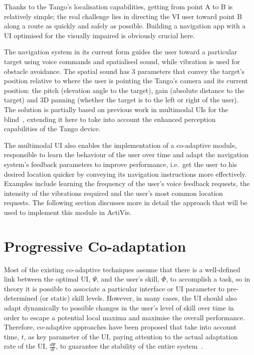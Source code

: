 \documentclass[letterpaper]{article}
\begin{document}
Thanks to the Tango's localisation capabilities, getting from point A to B is relatively simple; the real challenge lies in directing the VI user toward point B along a route as quickly and safely as possible. Building a navigation app with a UI optimised for the visually impaired is obviously crucial here. 

The navigation system in its current form guides the user toward a particular target using voice commands and spatialised sound, while vibration is used for obstacle avoidance. The spatial sound has 3 parameters that convey the target's position relative to where the user is pointing the Tango's camera and its current position: the pitch (elevation angle to the target), gain (absolute distance to the target) and 3D panning (whether the target is to the left or right of the user). The solution is partially based on previous work in multimodal UIs for the blind~\cite{bellotto2013}, extending it here to take into account the enhanced perception capabilities of the Tango device.

The multimodal UI also enables the implementation of a co-adaptive module, responsible to learn the behaviour of the user over time and adapt the navigation system's feedback parameters to improve performance, i.e.\ get the user to his desired location quicker by conveying its navigation instructions more effectively. Examples include learning the frequency of the user's voice feedback requests, the intensity of the vibrations required and the user's most common location requests. The following section discusses more in detail the approach that will be used to implement this module in ActiVis.

\section{Progressive Co-adaptation}\label{sec:adaptation}

Most of the existing co-adaptive techniques assume that there is a well-defined link between the optimal UI, $\Psi$, and the user's skill, $\Phi$, to accomplish a task, so in theory it is possible to associate a particular interface or UI parameter to pre-determined (or static) skill levels. However, in many cases, the UI should also adapt dynamically to possible changes in the user's level of skill over time in order to escape a potential local maxima and maximise the overall performance. Therefore, co-adaptive approaches have been proposed that take into account time, $t$, as  key parameter of the UI, paying attention to the actual adaptation rate of the UI, $\frac{d\Psi}{dt}$, to guarantee the stability of the entire system~\cite{Merel2013}.
\end{document}
